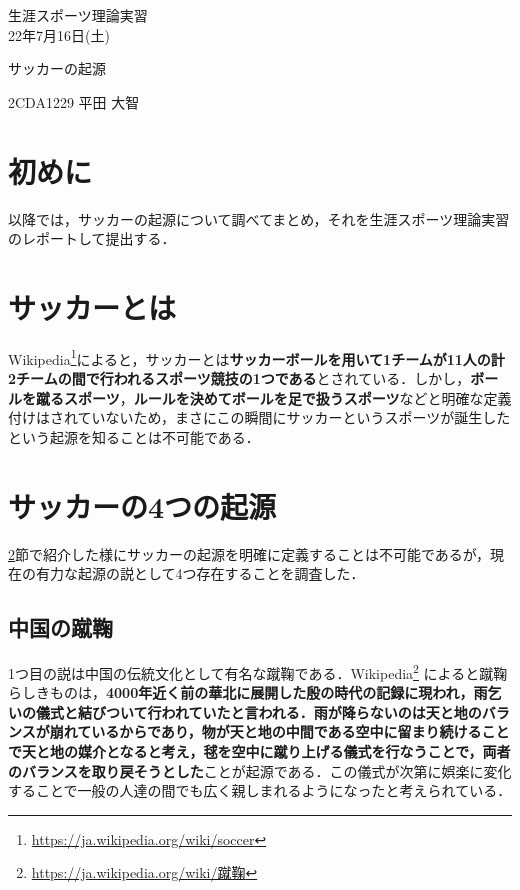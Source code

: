 \documentclass[a4paper]{ujarticle}
\begin{document}
    \begin{flushright}
        生涯スポーツ理論実習\\
        22年7月16日(土)
    \end{flushright}

    \begin{center}
        {\Large	サッカーの起源}
    \end{center}

    \begin{flushright}
        {\large 2CDA1229 平田 大智}\\
    \end{flushright}

    \section{初めに}
    以降では，サッカーの起源について調べてまとめ，それを生涯スポーツ理論実習のレポートして提出する．

    \section{サッカーとは}
        \label{sec:soccer}
        Wikipedia\footnote{\url{https://ja.wikipedia.org/wiki/soccer}}によると，サッカーとは\textbf{サッカーボールを用いて1チームが11人の計2チームの間で行われるスポーツ競技の1つである}とされている．しかし，\textbf{ボールを蹴るスポーツ}，\textbf{ルールを決めてボールを足で扱うスポーツ}などと明確な定義付けはされていないため，まさにこの瞬間にサッカーというスポーツが誕生したという起源を知ることは不可能である．

	\section{サッカーの4つの起源}
        \ref{sec:soccer}節で紹介した様にサッカーの起源を明確に定義することは不可能であるが，現在の有力な起源の説として4つ存在することを調査した．

        \subsection{中国の蹴鞠}
            \label{sec:kemari}
            1つ目の説は中国の伝統文化として有名な蹴鞠である．Wikipedia\footnote{\url{https://ja.wikipedia.org/wiki/蹴鞠}} によると蹴鞠らしきものは，\textbf{4000年近く前の華北に展開した殷の時代の記録に現われ，雨乞いの儀式と結びついて行われていたと言われる．雨が降らないのは天と地のバランスが崩れているからであり，物が天と地の中間である空中に留まり続けることで天と地の媒介となると考え，毬を空中に蹴り上げる儀式を行なうことで，両者のバランスを取り戻そうとした}ことが起源である．この儀式が次第に娯楽に変化することで一般の人達の間でも広く親しまれるようになったと考えられている．
\end{document}
